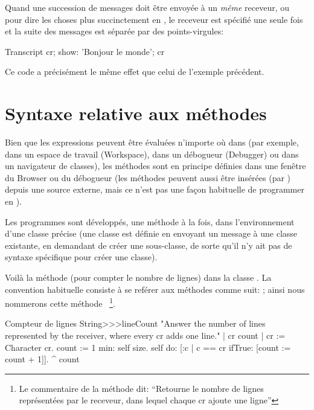 \documentclass[a4paper,10pt,twoside]{book}
\begin{document}
Quand une succession de messages doit \^{e}tre envoy\'{e}e \`{a} un \emph{m\^{e}me} receveur, 
ou pour dire les choses plus succinctement en , le receveur est sp\'{e}cifi\'{e} une seule fois et la suite des messages est s\'{e}par\'{e}e par des points-virgules:

\begin{code}{}
Transcript cr;
    show: 'Bonjour le monde';
    cr
\end{code}
Ce code a pr\'{e}cis\'{e}ment le m\^{e}me effet que celui de l'exemple pr\'{e}c\'{e}dent.


\section{Syntaxe relative aux m\'{e}thodes}
Bien que les expressions peuvent \^{e}tre \'{e}valu\'{e}es n'importe
o\`{u} dans \sq (par exemple, dans un espace de travail (Workspace),
dans un d\'{e}bogueur (Debugger) ou dans un navigateur de classes), 
les m\'{e}thodes sont en principe d\'{e}finies dans une fen\^{e}tre du Browser ou du d\'{e}bogueur
(les m\'{e}thodes peuvent aussi \^{e}tre insérées (par )
depuis une source externe, mais ce n'est pas une fa\c{c}on habituelle de programmer en \sq).

Les programmes sont d\'{e}velopp\'{e}s, une m\'{e}thode \`{a} la fois,
dans l'environnement d'une classe pr\'{e}cise (une classe est d\'{e}finie en envoyant un message \`{a} une classe existante, en demandant de cr\'{e}er une sous-classe, de sorte qu'il n'y ait pas de syntaxe sp\'{e}cifique pour cr\'{e}er une classe).

Voil\`{a} la m\'{e}thode  (pour compter le
nombre de lignes) dans la classe  .
La convention habituelle consiste à se ref\'{e}rer aux m\'{e}thodes
comme suit: ; ainsi nous nommerons cette
m\'{e}thode ~\footnote{Le commentaire de la
  m\'ethode dit: 
``Retourne le nombre de lignes représentées par le receveur, dans
    lequel chaque cr ajoute une ligne''}.

\begin{method}[lineCount]{Compteur de lignes}
String>>>lineCount
   "Answer the number of lines represented by the receiver,
   where every cr adds one line."
   | cr count |
   cr := Character cr.
   count := 1  min: self size.
   self do:
      [:c | c == cr ifTrue: [count := count + 1]].
   ^ count
\end{method}
\end{document}
